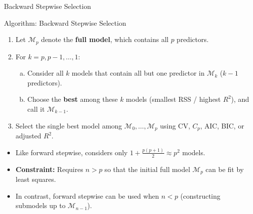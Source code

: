 \documentclass[aspectratio=169, 11pt]{beamer}
\begin{document}
\begin{frame}{Backward Stepwise Selection}
    \begin{block}{Algorithm: Backward Stepwise Selection}
    \begin{enumerate}
        \item Let $\mathcal{M}_p$ denote the \textbf{full model}, which contains all $p$ predictors.
        \item For $k = p, p-1, \dots, 1$:
        \begin{enumerate}[(a)]
            \item Consider all $k$ models that contain all but one predictor in $\mathcal{M}_k$ ($k - 1$ predictors).
            \item Choose the \textbf{best} among these $k$ models (smallest RSS / highest $R^2$), and call it $\mathcal{M}_{k-1}$.
        \end{enumerate}
        \item Select the single best model among $\mathcal{M}_0, \dots, \mathcal{M}_p$ using CV, $C_p$, AIC, BIC, or adjusted $R^2$.
    \end{enumerate}
    \end{block}
    \begin{itemize}
        \item Like forward stepwise, considers only $1 + \frac{p(p+1)}{2} \approx p^2$ models.
        \item \textbf{Constraint:} Requires $n > p$ so that the initial full model $\mathcal{M}_p$ can be fit by least squares.
        \item In contrast, forward stepwise can be used when $n < p$ (constructing submodels up to $\mathcal{M}_{n-1}$).
    \end{itemize}
\end{frame}
\end{document}

